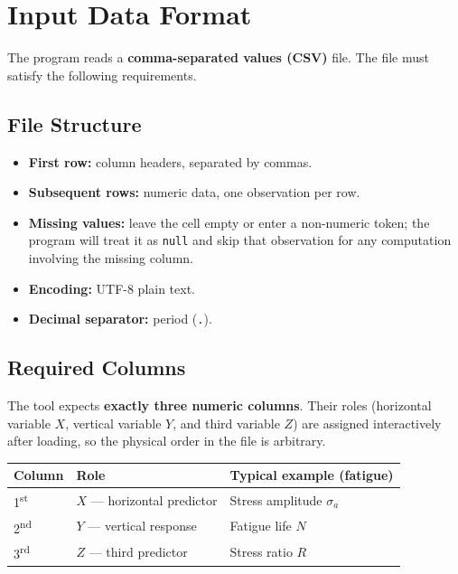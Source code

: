 \documentclass[12pt,a4paper]{article}
\begin{document}
\section{Input Data Format}

The program reads a \textbf{comma-separated values (CSV)} file.  The file must satisfy
the following requirements.

\subsection{File Structure}

\begin{itemize}[leftmargin=1.5em]
    \item \textbf{First row:} column headers, separated by commas.
    \item \textbf{Subsequent rows:} numeric data, one observation per row.
    \item \textbf{Missing values:} leave the cell empty or enter a non-numeric token;
          the program will treat it as \texttt{null} and skip that observation for
          any computation involving the missing column.
    \item \textbf{Encoding:} UTF-8 plain text.
    \item \textbf{Decimal separator:} period (\texttt{.}).
\end{itemize}

\subsection{Required Columns}

The tool expects \textbf{exactly three numeric columns}.  Their roles (horizontal
variable $X$, vertical variable $Y$, and third variable $Z$) are assigned interactively
after loading, so the physical order in the file is arbitrary.

\begin{center}
\begin{tabular}{@{}llp{7cm}@{}}
\toprule
\textbf{Column} & \textbf{Role} & \textbf{Typical example (fatigue)} \\
\midrule
1\textsuperscript{st} & $X$ --- horizontal predictor & Stress amplitude $\sigma_a$ \\
2\textsuperscript{nd} & $Y$ --- vertical response     & Fatigue life $N$ \\
3\textsuperscript{rd} & $Z$ --- third predictor        & Stress ratio $R$ \\
\bottomrule
\end{tabular}
\end{center}
\end{document}
